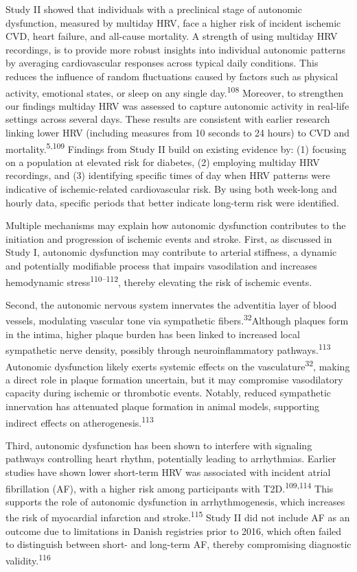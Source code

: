\documentclass[
  a4paper,
  headsepline=true,
  open=left]{scrbook}
\begin{document}
Study II showed that individuals with a preclinical stage of autonomic
dysfunction, measured by multiday HRV, face a higher risk of incident
ischemic CVD, heart failure, and all-cause mortality. A strength of
using multiday HRV recordings, is to provide more robust insights into
individual autonomic patterns by averaging cardiovascular responses
across typical daily conditions. This reduces the influence of random
fluctuations caused by factors such as physical activity, emotional
states, or sleep on any single day.\textsuperscript{108} Moreover, to
strengthen our findings multiday HRV was assessed to capture autonomic
activity in real-life settings across several days. These results are
consistent with earlier research linking lower HRV (including measures
from 10 seconds to 24 hours) to CVD and
mortality.\textsuperscript{5,109} Findings from Study II build on
existing evidence by: (1) focusing on a population at elevated risk for
diabetes, (2) employing multiday HRV recordings, and (3) identifying
specific times of day when HRV patterns were indicative of
ischemic-related cardiovascular risk. By using both week-long and hourly
data, specific periods that better indicate long-term risk were
identified.

Multiple mechanisms may explain how autonomic dysfunction contributes to
the initiation and progression of ischemic events and stroke. First, as
discussed in Study I, autonomic dysfunction may contribute to arterial
stiffness, a dynamic and potentially modifiable process that impairs
vasodilation and increases hemodynamic stress\textsuperscript{110--112},
thereby elevating the risk of ischemic events.

Second, the autonomic nervous system innervates the adventitia layer of
blood vessels, modulating vascular tone via sympathetic
fibers.\textsuperscript{32}Although plaques form in the intima, higher
plaque burden has been linked to increased local sympathetic nerve
density, possibly through neuroinflammatory
pathways.\textsuperscript{113} Autonomic dysfunction likely exerts
systemic effects on the vasculature\textsuperscript{32}, making a direct
role in plaque formation uncertain, but it may compromise vasodilatory
capacity during ischemic or thrombotic events. Notably, reduced
sympathetic innervation has attenuated plaque formation in animal
models, supporting indirect effects on
atherogenesis.\textsuperscript{113}

Third, autonomic dysfunction has been shown to interfere with signaling
pathways controlling heart rhythm, potentially leading to arrhythmias.
Earlier studies have shown lower short-term HRV was associated with
incident atrial fibrillation (AF), with a higher risk among participants
with T2D.\textsuperscript{109,114} This supports the role of autonomic
dysfunction in arrhythmogenesis, which increases the risk of myocardial
infarction and stroke.\textsuperscript{115} Study II did not include AF
as an outcome due to limitations in Danish registries prior to 2016,
which often failed to distinguish between short- and long-term AF,
thereby compromising diagnostic validity.\textsuperscript{116}
\end{document}
